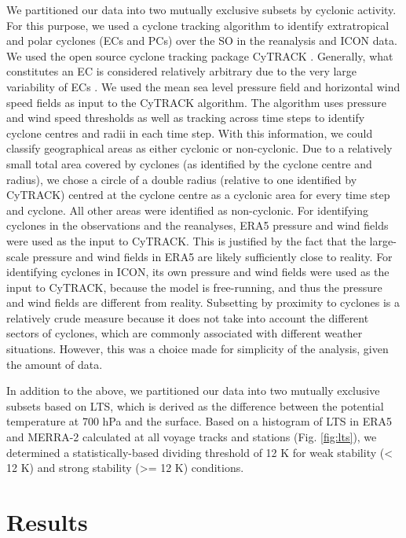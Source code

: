 \documentclass[12pt,a4paper]{article}
\begin{document}
We partitioned our data into two mutually exclusive subsets by cyclonic
activity. For this purpose, we used a cyclone tracking algorithm to identify
extratropical and polar cyclones (ECs and PCs) over the SO in the reanalysis
and ICON data. We used the open source cyclone tracking package CyTRACK
\citep{perez-alarcon2024}.  Generally, what constitutes an EC is considered
relatively arbitrary due to the very large variability of ECs \citep{neu2013}.
We used the mean sea level pressure field and horizontal wind speed fields as
input to the CyTRACK algorithm. The algorithm uses pressure and wind speed
thresholds as well as tracking across time steps to identify cyclone centres
and radii in each time step. With this information, we could classify
geographical areas as either cyclonic or non-cyclonic. Due to a relatively
small total area covered by cyclones (as identified by the cyclone centre and
radius), we chose a circle of a double radius (relative to one identified by
CyTRACK) centred at the cyclone centre as a cyclonic area for every time step
and cyclone. All other areas were identified as non-cyclonic. For identifying
cyclones in the observations and the reanalyses, ERA5 pressure and wind fields
were used as the input to CyTRACK.  This is justified by the fact that the
large-scale pressure and wind fields in ERA5 are likely sufficiently close to
reality. For identifying cyclones in ICON, its own pressure and wind fields
were used as the input to CyTRACK, because the model is free-running, and thus
the pressure and wind fields are different from reality. Subsetting by
proximity to cyclones is a relatively crude measure because it does not take
into account the different sectors of cyclones, which are commonly associated
with different weather situations. However, this was a choice made for
simplicity of the analysis, given the amount of data.

In addition to the above, we partitioned our data into two mutually exclusive
subsets based on LTS, which is derived as the difference between the potential
temperature at 700 hPa and the surface.  Based on a histogram of LTS in ERA5
and MERRA-2 calculated at all voyage tracks and stations (Fig.  \ref{fig:lts}),
we determined a statistically-based dividing threshold of 12 K for weak
stability (< 12 K) and strong stability (>= 12 K) conditions.

\section{Results}
\label{sec:results}
\end{document}
